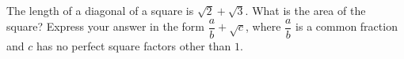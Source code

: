 The length of a diagonal of a square is $\sqrt2+\sqrt3$. What is the area of the square? Express your answer in the form $\dfrac {a}{b}+\sqrt c$, where $\dfrac {a}{b}$ is a common fraction and $c$ has no perfect square factors other than $1$.
